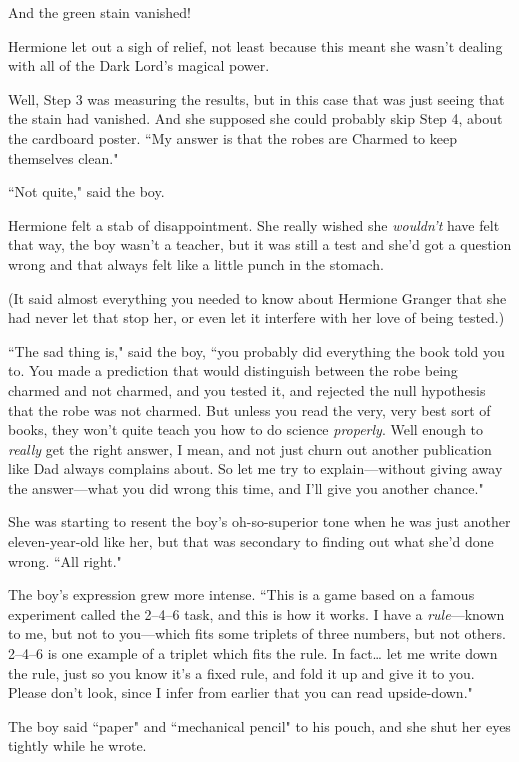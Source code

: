 And the green stain vanished!

Hermione let out a sigh of relief, not least because this meant she wasn't dealing with all of the Dark Lord's magical power.

Well, Step 3 was measuring the results, but in this case that was just seeing that the stain had vanished. And she supposed she could probably skip Step 4, about the cardboard poster. ``My answer is that the robes are Charmed to keep themselves clean."

``Not quite," said the boy.

Hermione felt a stab of disappointment. She really wished she \emph{wouldn't} have felt that way, the boy wasn't a teacher, but it was still a test and she'd got a question wrong and that always felt like a little punch in the stomach.

(It said almost everything you needed to know about Hermione Granger that she had never let that stop her, or even let it interfere with her love of being tested.)

``The sad thing is," said the boy, ``you probably did everything the book told you to. You made a prediction that would distinguish between the robe being charmed and not charmed, and you tested it, and rejected the null hypothesis that the robe was not charmed. But unless you read the very, very best sort of books, they won't quite teach you how to do science \emph{properly}. Well enough to \emph{really} get the right answer, I mean, and not just churn out another publication like Dad always complains about. So let me try to explain---without giving away the answer---what you did wrong this time, and I'll give you another chance."

She was starting to resent the boy's oh-so-superior tone when he was just another eleven-year-old like her, but that was secondary to finding out what she'd done wrong. ``All right."

The boy's expression grew more intense. ``This is a game based on a famous experiment called the 2--4--6 task, and this is how it works. I have a \emph{rule}---known to me, but not to you---which fits some triplets of three numbers, but not others. 2--4--6 is one example of a triplet which fits the rule. In fact{\ldots} let me write down the rule, just so you know it's a fixed rule, and fold it up and give it to you. Please don't look, since I infer from earlier that you can read upside-down."

The boy said ``paper" and ``mechanical pencil" to his pouch, and she shut her eyes tightly while he wrote.

